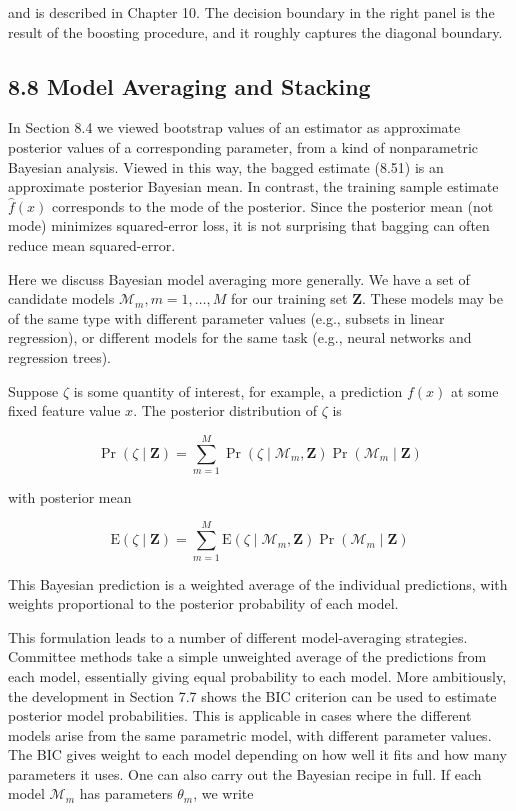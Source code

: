 \documentclass[10pt]{article}
\begin{document}
and is described in Chapter 10. The decision boundary in the right panel is the result of the boosting procedure, and it roughly captures the diagonal boundary.

\subsection*{8.8 Model Averaging and Stacking}
In Section 8.4 we viewed bootstrap values of an estimator as approximate posterior values of a corresponding parameter, from a kind of nonparametric Bayesian analysis. Viewed in this way, the bagged estimate (8.51) is an approximate posterior Bayesian mean. In contrast, the training sample estimate $\hat{f}(x)$ corresponds to the mode of the posterior. Since the posterior mean (not mode) minimizes squared-error loss, it is not surprising that bagging can often reduce mean squared-error.

Here we discuss Bayesian model averaging more generally. We have a set of candidate models $\mathcal{M}_{m}, m=1, \ldots, M$ for our training set $\mathbf{Z}$. These models may be of the same type with different parameter values (e.g., subsets in linear regression), or different models for the same task (e.g., neural networks and regression trees).

Suppose $\zeta$ is some quantity of interest, for example, a prediction $f(x)$ at some fixed feature value $x$. The posterior distribution of $\zeta$ is


\begin{equation*}
\operatorname{Pr}(\zeta \mid \mathbf{Z})=\sum_{m=1}^{M} \operatorname{Pr}\left(\zeta \mid \mathcal{M}_{m}, \mathbf{Z}\right) \operatorname{Pr}\left(\mathcal{M}_{m} \mid \mathbf{Z}\right) \tag{8.53}
\end{equation*}


with posterior mean


\begin{equation*}
\mathrm{E}(\zeta \mid \mathbf{Z})=\sum_{m=1}^{M} \mathrm{E}\left(\zeta \mid \mathcal{M}_{m}, \mathbf{Z}\right) \operatorname{Pr}\left(\mathcal{M}_{m} \mid \mathbf{Z}\right) \tag{8.54}
\end{equation*}


This Bayesian prediction is a weighted average of the individual predictions, with weights proportional to the posterior probability of each model.

This formulation leads to a number of different model-averaging strategies. Committee methods take a simple unweighted average of the predictions from each model, essentially giving equal probability to each model. More ambitiously, the development in Section 7.7 shows the BIC criterion can be used to estimate posterior model probabilities. This is applicable in cases where the different models arise from the same parametric model, with different parameter values. The BIC gives weight to each model depending on how well it fits and how many parameters it uses. One can also carry out the Bayesian recipe in full. If each model $\mathcal{M}_{m}$ has parameters $\theta_{m}$, we write
\end{document}
